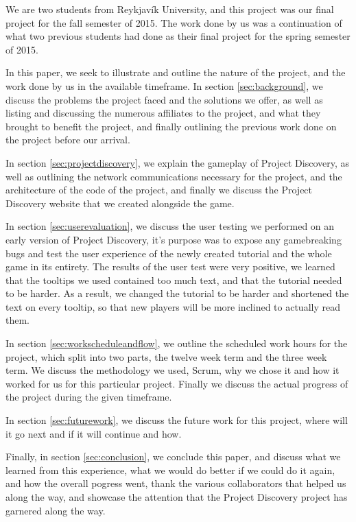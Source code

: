 We are two students from Reykjavík University, and this project was our final project for the fall semester of 2015. The work done by us was a continuation of what two previous students had done as their final project for the spring semester of 2015. 

In this paper, we seek to illustrate and outline the nature of the project, and the work done by us in the available timeframe. In section \ref{sec:background}, we discuss the problems the project faced and the solutions we offer, as well as listing and discussing the numerous affiliates to the project, and what they brought to benefit the project, and finally outlining the previous work done on the project before our arrival. 

In section \ref{sec:projectdiscovery}, we explain the gameplay of Project Discovery, as well as outlining the network communications necessary for the project, and the architecture of the code of the project, and finally we discuss the Project Discovery website that we created alongside the game. 

In section \ref{sec:userevaluation}, we discuss the user testing we performed on an early version of Project Discovery, it's purpose was to expose any gamebreaking bugs and test the user experience of the newly created tutorial and the whole game in its entirety. The results of the user test were very positive, we learned that the tooltips we used contained too much text, and that the tutorial needed to be harder. As a result, we changed the tutorial to be harder and shortened the text on every tooltip, so that new players will be more inclined to actually read them.

In section \ref{sec:workscheduleandflow}, we outline the scheduled work hours for the project, which split into two parts, the twelve week term and the three week term. We discuss the methodology we used, Scrum, why we chose it and how it worked for us for this particular project. Finally we discuss the actual progress of the project during the given timeframe.

In section \ref{sec:futurework}, we discuss the future work for this project, where will it go next and if it will continue and how.

Finally, in section \ref{sec:conclusion}, we conclude this paper, and discuss what we learned from this experience, what we would do better if we could do it again, and how the overall pogress went, thank the various collaborators that helped us along the way, and showcase the attention that the Project Discovery project has garnered along the way.